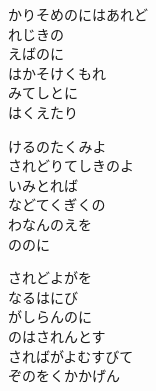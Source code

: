 \documentclass[10pt,b5j]{tarticle} %
\begin{document}
\begin{enumerate}
\begin{minipage}[c]{\blocksize}
        \vspace{\linespace}
        \item
        かりそめのにはあれど\\
        れじきの\\
        えばのに\\
        はかそけくもれ\\
        みてしとに\\
        はくえたり
        
        \vspace{\linespace}
        \item
        けるのたくみよ\\
        されどりてしきのよ\\
        いみとれば\\
        などてくぎくの\\
        わなんのえを\\
        ののに
        
        \vspace{\linespace}
        \item
        されどよがを\\
        なるはにび\\
        がしらんのに\\
        のはされんとす\\
        さればがよむすびて\\
        ぞのをくかかげん
    
    \end{minipage}
\end{enumerate} %
\end{document}
